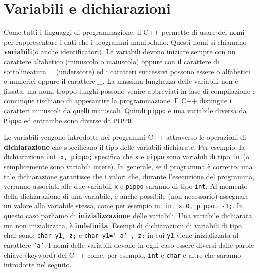 \section{Variabili e dichiarazioni}
\noindent Come tutti i linguaggi di programmazione, il C++ permette di usare dei nomi per rappresentare i dati che i programmi manipolano.
Questi nomi si chiamano \textbf{variabili}(o anche identificatori).
Le variabili devono iniziare sempre con un carattere alfabetico (minuscolo o maiuscolo) oppure con il carattere di sottolineatura \_ (un­derscore) ed i caratteri successivi possono essere o alfabetici o numerici oppure il carattere \_.
La massima lunghezza delle variabili non è fissata, ma nomi troppo lunghi possono venire abbreviati in fase di compilazione e comunque rischiano di appesantire la programmazione.
Il C++ distingue i caratteri minuscoli da quelli maiuscoli.
Quindi \texttt{pippo} è una variabile diversa da \texttt{Pippo} ed entrambe sono diverse da \texttt{PIPPO}. 

Le variabili vengono introdotte nei programmi C++ attraverso le operazioni di \textbf{dichiarazione} che specificano il tipo delle variabili dichiarate.
Per esempio, la dichiarazione \texttt{int x, pippo;} specifica che \texttt{x} e \texttt{pippo} sono variabili di tipo \texttt{int}(o semplicemente sono variabili intere).
In generale, se il programma è corretto, una tale dichiarazione garantisce che i valori che, durante l'esecuzione del programma, verranno associati alle due variabili \texttt{x} e \texttt{pippo} saranno di tipo \texttt{int}.
Al momento della dichiarazione di una variabile, è anche possibile (non necessario) assegnare un valore alla variabile stessa, come per esempio in: \texttt{int x=O, pippo= -1;}.
In questo caso parliamo di \textbf{inizializzazione} delle variabili.
Una variabile dichiarata, ma non inizializzata, è \textbf{indefinita}.
Esempi di dichiarazioni di variabili di tipo char sono: \texttt{char y1, z;} e \texttt{char y1=' a' , z;} in cui \texttt{y1} viene inizializzata al carattere \texttt{'a'}.
I nomi delle variabili devono in ogni caso essere diversi dalle parole chiave (keyword) del C++ come, per esempio, \texttt{int} e \texttt{char} e altre che saranno introdotte nel seguito. 

